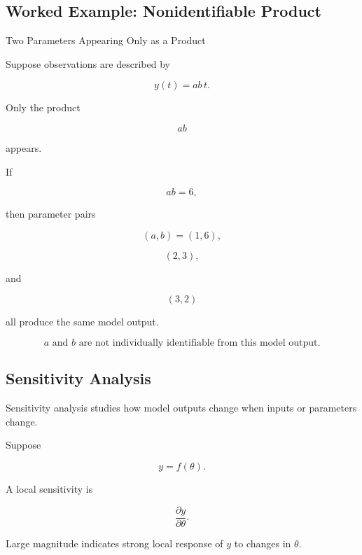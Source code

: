 \subsection{Worked Example: Nonidentifiable Product}
\label{subsec:worked-nonidentifiable-product}

\begin{workedexamplebox}{Two Parameters Appearing Only as a Product}

Suppose observations are described by

\[
y(t)
=
ab\,t.
\]

Only the product

\[
ab
\]

appears.

If

\[
ab=6,
\]

then parameter pairs

\[
(a,b)=(1,6),
\]

\[
(2,3),
\]

and

\[
(3,2)
\]

all produce the same model output.

\begin{answerbox}
\[
\boxed{
a
\text{ and }
b
\text{ are not individually identifiable from this model output.}
}
\]
\end{answerbox}

\end{workedexamplebox}

\subsection{Sensitivity Analysis}
\label{subsec:model-sensitivity-analysis}

Sensitivity analysis studies how model outputs change when inputs or
parameters change.

Suppose

\[
y=f(\theta).
\]

A local sensitivity is

\[
\boxed{
\frac{\partial y}{\partial\theta}.
}
\]

Large magnitude indicates strong local response of \(y\) to changes in
\(\theta\).

